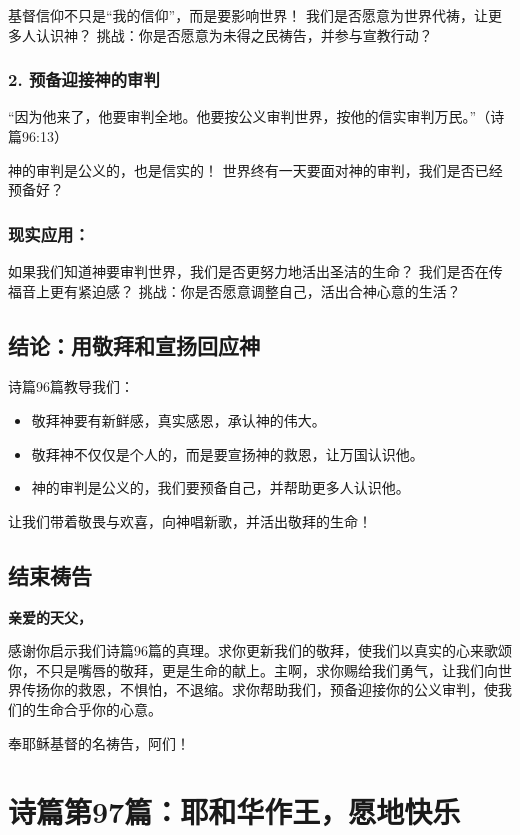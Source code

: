 \documentclass[a4paper, 12pt]{article}
\begin{document}
基督信仰不只是“我的信仰”，而是要影响世界！
我们是否愿意为世界代祷，让更多人认识神？
挑战：你是否愿意为未得之民祷告，并参与宣教行动？

\subsubsection*{2. 预备迎接神的审判}
“因为他来了，他要审判全地。他要按公义审判世界，按他的信实审判万民。”（诗篇96:13）

神的审判是公义的，也是信实的！
世界终有一天要面对神的审判，我们是否已经预备好？
\subsubsection*{现实应用：}

如果我们知道神要审判世界，我们是否更努力地活出圣洁的生命？
我们是否在传福音上更有紧迫感？
挑战：你是否愿意调整自己，活出合神心意的生活？

\subsection*{结论：用敬拜和宣扬回应神}
诗篇96篇教导我们：
\begin{itemize}
    \item 敬拜神要有新鲜感，真实感恩，承认神的伟大。

    \item 敬拜神不仅仅是个人的，而是要宣扬神的救恩，让万国认识他。

    \item 神的审判是公义的，我们要预备自己，并帮助更多人认识他。

\end{itemize}

让我们带着敬畏与欢喜，向神唱新歌，并活出敬拜的生命！

\subsection*{结束祷告}
\textbf{亲爱的天父，}

感谢你启示我们诗篇96篇的真理。求你更新我们的敬拜，使我们以真实的心来歌颂你，不只是嘴唇的敬拜，更是生命的献上。主啊，求你赐给我们勇气，让我们向世界传扬你的救恩，不惧怕，不退缩。求你帮助我们，预备迎接你的公义审判，使我们的生命合乎你的心意。

奉耶稣基督的名祷告，阿们！
\newpage
\section{诗篇第97篇：耶和华作王，愿地快乐}
\end{document}
